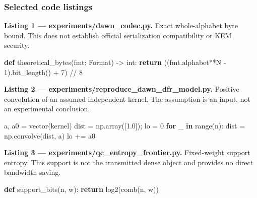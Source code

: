 \documentclass[
  10pt,
  a4paper,
]{article}
\newenvironment{Shaded}{}{}
\newcommand{\BuiltInTok}[1]{\textcolor[rgb]{0.00,0.50,0.00}{#1}}
\newcommand{\ControlFlowTok}[1]{\textcolor[rgb]{0.00,0.44,0.13}{\textbf{#1}}}
\newcommand{\DecValTok}[1]{\textcolor[rgb]{0.25,0.63,0.44}{#1}}
\newcommand{\FloatTok}[1]{\textcolor[rgb]{0.25,0.63,0.44}{#1}}
\newcommand{\KeywordTok}[1]{\textcolor[rgb]{0.00,0.44,0.13}{\textbf{#1}}}
\newcommand{\NormalTok}[1]{#1}
\newcommand{\OperatorTok}[1]{\textcolor[rgb]{0.40,0.40,0.40}{#1}}
\begin{document}
\hypertarget{selected-code-listings}{%
\subsubsection{Selected code listings}\label{selected-code-listings}}

\textbf{Listing 1 --- experiments/dawn\_codec.py.} Exact whole-alphabet
byte bound. This does not establish official serialization compatibility
or KEM security.

\begin{Shaded}
\begin{Highlighting}[]
\KeywordTok{def}\NormalTok{ theoretical\_bytes(fmt: Format) }\OperatorTok{{-}\textgreater{}} \BuiltInTok{int}\NormalTok{:}
    \ControlFlowTok{return}\NormalTok{ ((fmt.alphabet}\OperatorTok{**}\NormalTok{N }\OperatorTok{{-}} \DecValTok{1}\NormalTok{).bit\_length() }\OperatorTok{+} \DecValTok{7}\NormalTok{) }\OperatorTok{//} \DecValTok{8}
\end{Highlighting}
\end{Shaded}

\textbf{Listing 2 --- experiments/reproduce\_dawn\_dfr\_model.py.}
Positive convolution of an assumed independent kernel. The assumption is
an input, not an experimental conclusion.

\begin{Shaded}
\begin{Highlighting}[]
\NormalTok{a, a0 }\OperatorTok{=}\NormalTok{ vector(kernel)}
\NormalTok{dist }\OperatorTok{=}\NormalTok{ np.array([}\FloatTok{1.0}\NormalTok{])}\OperatorTok{;}\NormalTok{ lo }\OperatorTok{=} \DecValTok{0}
\ControlFlowTok{for}\NormalTok{ \_ }\KeywordTok{in} \BuiltInTok{range}\NormalTok{(n):}
\NormalTok{    dist }\OperatorTok{=}\NormalTok{ np.convolve(dist, a)}
\NormalTok{    lo }\OperatorTok{+=}\NormalTok{ a0}
\end{Highlighting}
\end{Shaded}

\textbf{Listing 3 --- experiments/qc\_entropy\_frontier.py.}
Fixed-weight support entropy. This support is not the transmitted dense
object and provides no direct bandwidth saving.

\begin{Shaded}
\begin{Highlighting}[]
\KeywordTok{def}\NormalTok{ support\_bits(n, w):}
    \ControlFlowTok{return}\NormalTok{ log2(comb(n, w))}
\end{Highlighting}
\end{Shaded}
\end{document}
